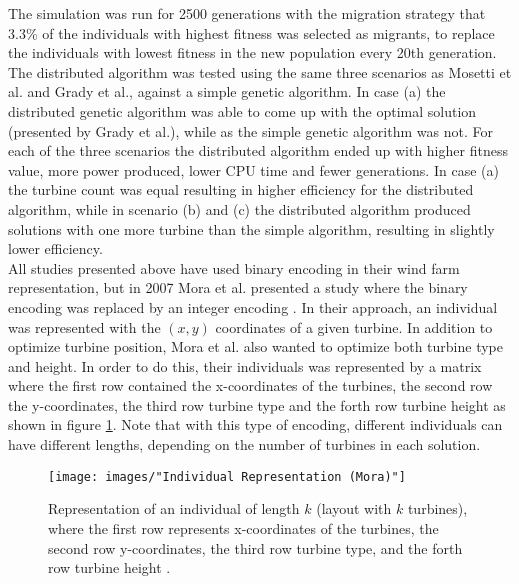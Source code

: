 \noindent The simulation was run for 2500 generations with the migration strategy that 3.3\% of the individuals with highest fitness was selected as migrants, to replace the individuals with lowest fitness in the new population every 20th generation. The distributed algorithm was tested using the same three scenarios as Mosetti et al. and Grady et al., against a simple genetic algorithm. In case (a) the distributed genetic algorithm was able to come up with the optimal solution (presented by Grady et al.), while as the simple genetic algorithm was not. For each of the three scenarios the distributed algorithm ended up with higher fitness value, more power produced, lower CPU time and fewer generations. In case (a) the turbine count was equal resulting in higher efficiency for the distributed algorithm, while in scenario (b) and (c) the distributed algorithm produced solutions with one more turbine than the simple algorithm, resulting in slightly lower efficiency. \\


\noindent All studies presented above have used binary encoding in their wind farm representation, but in 2007 Mora et al. presented a study where the binary encoding was replaced by an integer encoding \citep{Mora}. In their approach, an individual was represented with the $(x, y)$ coordinates of a given turbine. In addition to optimize turbine position, Mora et al. also wanted to optimize both turbine type and height. In order to do this, their individuals was represented by a matrix where the first row contained the x-coordinates of the turbines, the second row the y-coordinates, the third row turbine type and the forth row turbine height as shown in figure \ref{Individual Representation (Mora)}. Note that with this type of encoding, different individuals can have different lengths, depending on the number of turbines in each solution.\\


\begin{figure}[h!]
\begin{center}
\texttt{[image: images/"Individual Representation (Mora)"]}
\caption{Representation of an individual of length $k$ (layout with $k$ turbines), where the first row represents x-coordinates of the turbines, the second row y-coordinates, the third row turbine type, and the forth row turbine height \citep{Mora}.}
\label{Individual Representation (Mora)}
\end{center}
\end{figure}


